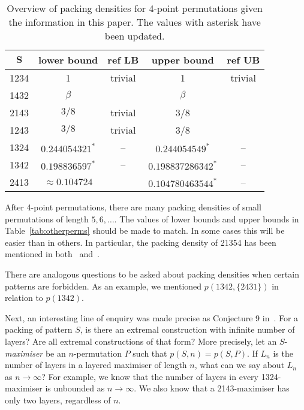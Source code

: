 \begin{table}[ht]
\centering
\begin{tabular}{|c | c | c | c | c|}
\hline
$\mathbf{S}$ & \textbf{lower bound} & \textbf{ref LB} & \textbf{upper bound} & \textbf{ref UB}\\
\hline\hline
1234 & 1 & trivial & 1 & trivial\\
\hline
1432 & $\beta$ & \cite{price1997packing} & $\beta$ & \cite{price1997packing}\\
\hline
2143 & $3/8$ & trivial & 3/8 & \cite{price1997packing}\\
\hline
1243 & $3/8$ & trivial & 3/8 & \cite{albert2002packing}\\
\hline
1324 & $0.244054321^*$ & -- & $0.244054549^*$ & -- \\
\hline
1342 & $0.198836597^*$ & --  & $0.198837286342^*$ & -- \\
\hline
2413 & $\approx 0.104724$ & \cite{presutti2010packing} & $0.104780463544^*$ & -- \\
\hline
\end{tabular}
\caption{\small{Overview of packing densities for 4-point permutations given the information in this paper. The values with asterisk have been updated.}}
\label{tab:updated}
\end{table}

After 4-point permutations, there are many packing densities of small permutations of length $5, 6,\ldots$. The values of lower bounds and upper bounds in Table~\ref{tab:otherperms} should be made to match. In some cases this will be easier than in others. In particular, the packing density of 21354 has been mentioned in both~\cite{albert2002packing} and~\cite{hasto2002packing}.

There are analogous questions to be asked about packing densities when certain patterns are forbidden. As an example, we mentioned $p(1342,\{2431\})$ in relation to $p(1342)$. 

Next, an interesting line of enquiry was made precise as Conjecture 9 in~\cite{albert2002packing}. For a packing of pattern $S$, is there an extremal construction with infinite number of layers? Are all extremal constructions of that form? More precisely, let an $S$-\emph{maximiser} be an $n$-permutation $P$ such that $p(S,n) = p(S,P)$. If $L_n$ is the number of layers in a layered maximiser of length $n$, what can we say about $L_n$ as $n\to\infty$? For example, we know that the number of layers in every 1324-maximiser is unbounded as $n \to \infty$. We also know that a 2143-maximiser has only two layers, regardless of $n$.
